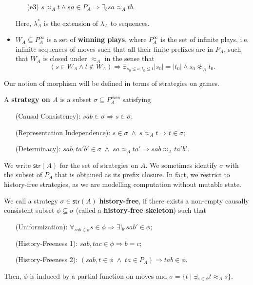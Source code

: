 \documentclass[runningheads,a4paper]{llncs}
\newcommand{\str}{\mathsf{str}}
\renewcommand{\emph}[1]{\textbf{#1}}
\begin{document}
\begin{definition}[Game]
\begin{itemize}
\begin{enumerate}
\item[(e3)] $s\approx_A t\wedge sa\in P_A\Rightarrow \exists_bsa\approx_A tb$.
\end{enumerate}
Here, $\lambda_A^*$ is the extension of $\lambda_A$ to sequences. 
\item $W_A\subseteq P_A^\infty$ is a set of \emph{winning plays}, where $P_A^\infty$ is the set of infinite plays, i.e. infinite sequences of moves such that all their finite prefixes are in $P_A$, such that $W_A$ is closed under $\approx_A$ in the sense that\vspace{-5pt}
$$\left( s\in W_A\wedge t\notin W_A \right)\Rightarrow \exists_{s_0\leq s,t_0\leq t}|s_0|=|t_0|\wedge s_0\not\approx_A t_0. $$
\end{itemize}
\end{definition}
Our notion of morphism will be defined in terms of strategies on games.
\begin{definition}[Strategy] A \emph{strategy on $A$} is a subset $\sigma\subseteq P_A^{\mathsf{even}}$ satisfying\vspace{-3pt}
\begin{itemize}
\item[] (Causal Consistency): $sab\in \sigma\Rightarrow s\in \sigma$;
\item[] (Representation Independence): $ s\in\sigma\;\wedge\; s\approx_A t\Rightarrow t\in\sigma$;
\item[] (Determinacy): $sab,ta'b'\in \sigma\;\wedge\; sa\approx_A ta'\Rightarrow sab\approx_A ta'b'$.
\end{itemize}
\end{definition}
We write $\str(A)$ for the set of strategies on $A$. We sometimes identify $\sigma$ with the subset of $P_A$ that is obtained as its prefix closure. In fact, we restrict to history-free strategies, as we are modelling computation without mutable state. 
\begin{definition} We call a strategy $\sigma\in\str(A)$ \emph{history-free}, if there exists a non-empty causally consistent subset $\phi\subseteq \sigma$ (called a \emph{history-free skeleton}) such that
\begin{itemize}\vspace{-6pt}
\item[] (Uniformization): $\forall_{sab\in\sigma}s\in\phi\Rightarrow\exists !_{b'}sab'\in\phi$;
\item[] (History-Freeness 1): $sab,tac\in\phi\Rightarrow b=c$;
\item[] (History-Freeness 2): $\left(sab,t\in\phi\;\wedge\;ta\in P_A\right)\Rightarrow tab\in\phi$.\vspace{-4pt}
\end{itemize}
Then, $\phi$ is induced by a partial function on moves and $\sigma=\{t \;|\; \exists_{s\in\phi}t\approx_A s\}$.
\end{definition}
\end{document}
